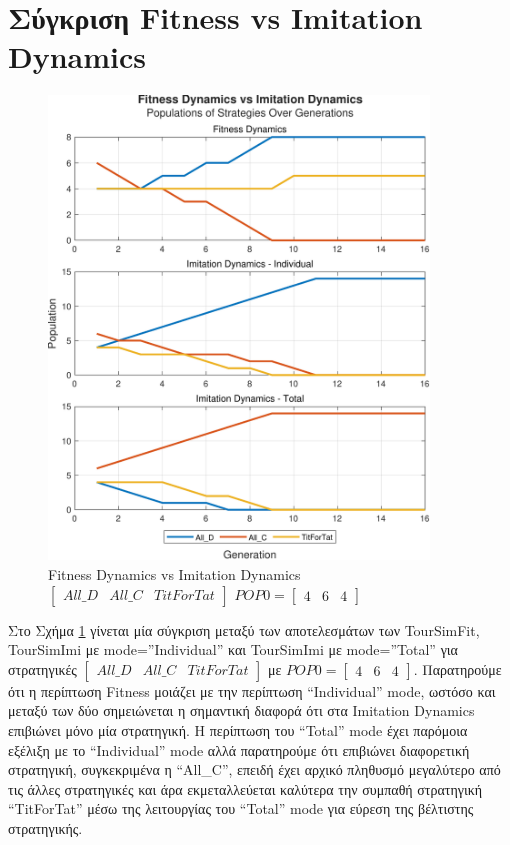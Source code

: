 \documentclass[12pt]{article}
\begin{document}
\section{Σύγκριση Fitness vs Imitation Dynamics}
	\begin{figure}[h]
	      \centering
	      \includegraphics[width=0.9\textwidth]{Fitness Dynamics vs Imitation Dynamics.pdf}
	      \caption{Fitness Dynamics vs Imitation Dynamics $\begin{bmatrix}All\_D&All\_C&TitForTat\end{bmatrix}$ $POP0=\begin{bmatrix}4&6&4\end{bmatrix}$}
	      \label{fig:Fitness Dynamics vs Imitation Dynamics}
	\end{figure}
Στο Σχήμα \ref{fig:Fitness Dynamics vs Imitation Dynamics} γίνεται μία σύγκριση μεταξύ των αποτελεσμάτων των TourSimFit, TourSimImi με mode=''Individual'' και TourSimImi με mode=''Total'' για στρατηγικές $\begin{bmatrix}All\_D&All\_C&TitForTat\end{bmatrix}$ με $POP0=\begin{bmatrix}4&6&4\end{bmatrix}$.
Παρατηρούμε ότι η περίπτωση Fitness μοιάζει με την περίπτωση ``Individual'' mode, ωστόσο και μεταξύ των δύο σημειώνεται η σημαντική διαφορά ότι στα Imitation Dynamics επιβιώνει μόνο μία στρατηγική. Η περίπτωση του ``Total'' mode έχει παρόμοια εξέλιξη με το ``Individual'' mode αλλά παρατηρούμε ότι επιβιώνει διαφορετική στρατηγική, συγκεκριμένα η ``All\_C'', επειδή έχει αρχικό πληθυσμό μεγαλύτερο από τις άλλες στρατηγικές και άρα εκμεταλλεύεται καλύτερα την συμπαθή στρατηγική ``TitForTat'' μέσω της λειτουργίας του ``Total'' mode για εύρεση της βέλτιστης στρατηγικής.
\end{document}
